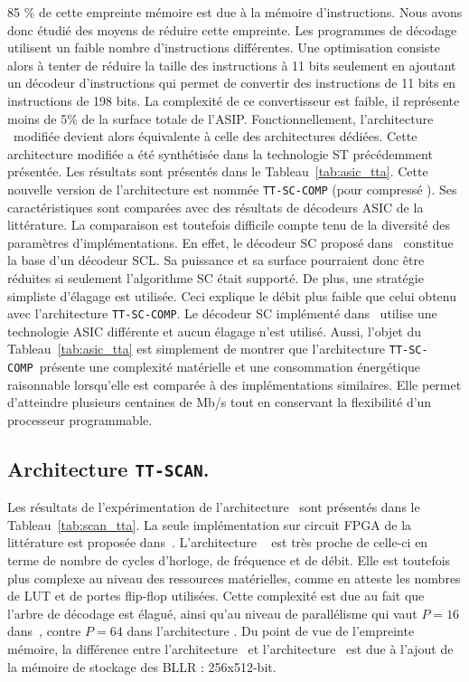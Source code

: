 85 \% de cette empreinte mémoire est due à la mémoire d'instructions. Nous avons donc étudié des moyens de réduire cette empreinte. Les programmes de décodage utilisent un faible nombre d'instructions différentes. Une optimisation consiste alors à tenter de réduire la taille des instructions à 11 bits seulement en ajoutant un décodeur d'instructions qui permet de convertir des instructions de 11 bits en instructions de 198 bits. La complexité de ce convertisseur est faible, il représente moins de 5\% de la surface totale de l'ASIP. Fonctionnellement, l'architecture \TTSC~modifiée devient alors équivalente à celle des architectures dédiées. Cette architecture modifiée a été synthétisée dans la technologie ST précédemment présentée. Les résultats sont présentés dans le Tableau~\ref{tab:asic_tta}. Cette nouvelle version de l'architecture est nommée \texttt{TT-SC-COMP} (pour \og compressé \fg). Ses caractéristiques sont comparées avec des résultats de décodeurs ASIC de la littérature. La comparaison est toutefois difficile compte tenu de la diversité des paramètres d'implémentations. En effet, le décodeur SC proposé dans~\cite{giard_polarbear:_2017} constitue la base d'un décodeur SCL. Sa puissance et sa surface pourraient donc être réduites si seulement l'algorithme SC était supporté. De plus, une stratégie simpliste d'élagage est utilisée. Ceci explique le débit plus faible que celui obtenu avec l'architecture \texttt{TT-SC-COMP}. Le décodeur SC implémenté dans~\cite{mishra_successive_2012} utilise une technologie ASIC différente et aucun élagage n'est utilisé. Aussi, l'objet du Tableau~\ref{tab:asic_tta} est simplement de montrer que l’architecture \texttt{TT-SC-COMP}~présente une complexité matérielle et une consommation énergétique raisonnable lorsqu'elle est comparée à des implémentations similaires. Elle permet d'atteindre plusieurs centaines de Mb/s tout en conservant la flexibilité d'un processeur programmable.


\subsection{Architecture \texttt{TT-SCAN}.}

Les résultats de l'expérimentation de l'architecture \TTSCAN~sont présentés dans le Tableau~\ref{tab:scan_tta}. La seule implémentation sur circuit FPGA de la littérature est proposée dans~\cite{berhault_hardware_2015}. L'architecture \TTSCAN~ est très proche de celle-ci en terme de nombre de cycles d'horloge, de fréquence et de débit. Elle est toutefois plus complexe au niveau des ressources matérielles, comme en atteste les nombres de LUT et de portes flip-flop utilisées. Cette complexité est due au fait que l'arbre de décodage est élagué, ainsi qu'au niveau de parallélisme qui vaut $P=16$ dans~\cite{berhault_hardware_2015}, contre $P=64$ dans l'architecture \TTSCAN. Du point de vue de l'empreinte mémoire, la différence entre l'architecture \TTSC~et l'architecture \TTSCAN~est due à l'ajout de la mémoire de stockage des BLLR : 256x512-bit.

